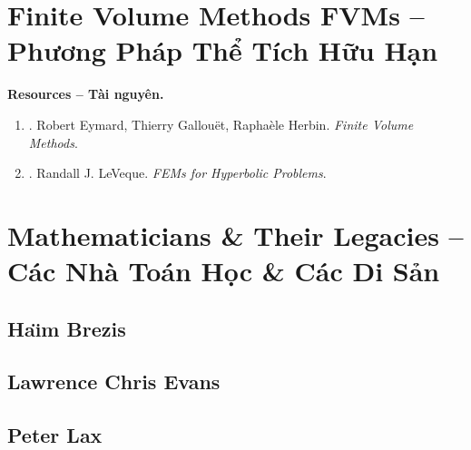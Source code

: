 \documentclass{article}
\begin{document}

\section{Finite Volume Methods FVMs -- Phương Pháp Thể Tích Hữu Hạn}
\textbf{\textsf{Resources -- Tài nguyên.}}
\begin{enumerate}
	\item \cite{Eymard_Gallouet_Herbin2019}. {\sc Robert Eymard, Thierry Gallou\"et, Rapha\`ele Herbin}. {\it Finite Volume Methods}.
	\item \cite{LeVeque2002}. {\sc Randall J. LeVeque}. {\it FEMs for Hyperbolic Problems}.
\end{enumerate}


\section{Mathematicians \& Their Legacies -- Các Nhà Toán Học \& Các Di Sản}

\subsection{Ha\"\i m Brezis}


\subsection{Lawrence Chris Evans}



\subsection{Peter Lax}

\end{document}
